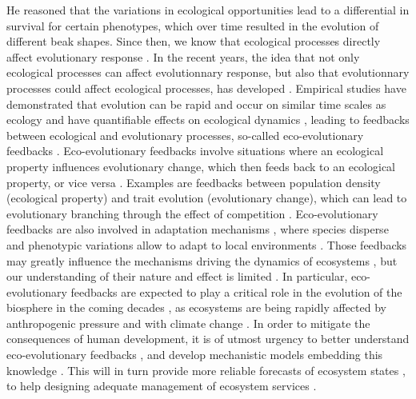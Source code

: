 % 
He reasoned that the variations in ecological opportunities lead to a differential in survival for certain phenotypes, which over time resulted in the evolution of different beak shapes.
% 
Since then, we know that ecological processes directly affect evolutionary response \citep{Ezard2009}.
% 
In the recent years, the idea that not only ecological processes can affect evolutionnary response, but also that evolutionnary processes could affect ecological processes, has developed \citep{XXX}.
% 
Empirical studies have demonstrated that evolution can be rapid and occur on similar time scales as ecology \citep{Hairston2005, Pelletier2009} and have quantifiable effects on ecological dynamics \citep{Ezard2009}, leading to feedbacks between ecological and evolutionary processes, so-called eco-evolutionary feedbacks \citep{Pelletier2009,Schoener2011}. 
% 
Eco-evolutionary feedbacks involve situations where an ecological property influences evolutionary change, which then feeds back to an ecological property, or vice versa \citep{Govaert2019a}. Examples are feedbacks between population density (ecological property) and trait evolution (evolutionary change), which can lead to evolutionary branching through the effect of competition \citep{Doebeli1999}.
% 
Eco-evolutionary feedbacks are also involved in adaptation mechanisms \citep{Doebeli1999}, where species disperse and phenotypic variations allow to adapt to local environments \citep{XXX}.
% 
Those feedbacks may greatly influence the mechanisms driving the dynamics of ecosystems \citep{Urban2016}, but our understanding of their nature and effect is limited \citep{Lion2022}.
% 
In particular, eco-evolutionary feedbacks are expected to play a critical role in the evolution of the biosphere in the coming decades \citep{Norberg2012}, as ecosystems are being rapidly affected by anthropogenic pressure and with climate change \citep{Ellis2011,Midgley2019}.
% 
In order to mitigate the consequences of human development, it is of utmost urgency to better understand eco-evolutionary feedbacks \citep{Norberg2012}, and develop mechanistic models embedding this knowledge \citep{Urban2016}. This will in turn provide more reliable forecasts of ecosystem states \citep{Clark2001}, to help designing adequate management of ecosystem services \citep{Urban2016}.
% 
% 



